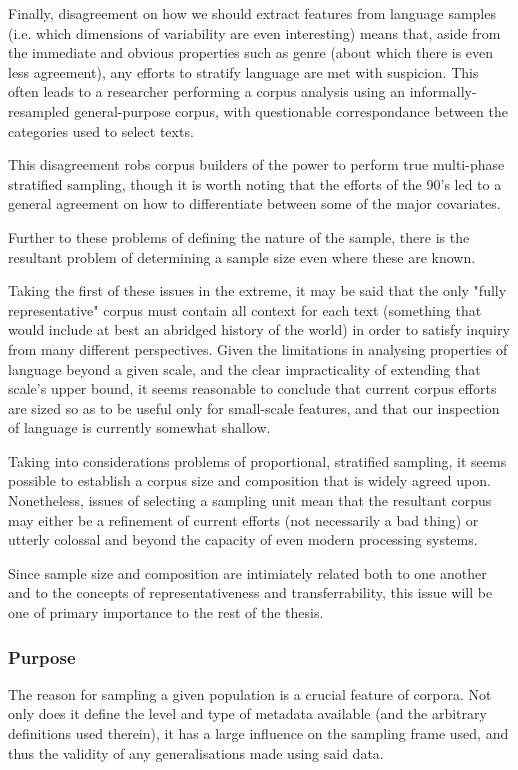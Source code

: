 
Finally, disagreement on how we should extract features from language samples (i.e. which dimensions of variability are even interesting) means that, aside from the immediate and obvious properties such as genre (about which there is even less agreement), any efforts to stratify language are met with suspicion.  This often leads to a researcher performing a corpus analysis using an informally-resampled general-purpose corpus, with questionable correspondance between the categories used to select texts.

This disagreement robs corpus builders of the power to perform true multi-phase stratified sampling, though it is worth noting that the efforts of the 90's led to a general agreement on how to differentiate between some of the major covariates.


Further to these problems of defining the nature of the sample, there is the resultant problem of determining a sample size even where these are known.  

Taking the first of these issues in the extreme, it may be said that the only "fully representative" corpus must contain all context for each text (something that would include at best an abridged history of the world) in order to satisfy inquiry from many different perspectives.  Given the limitations in analysing properties of language beyond a given scale, and the clear impracticality of extending that scale's upper bound, it seems reasonable to conclude that current corpus efforts are sized so as to be useful only for small-scale features, and that our inspection of language is currently somewhat shallow.

Taking into considerations problems of proportional, stratified sampling, it seems possible to establish a corpus size and composition that is widely agreed upon.  Nonetheless, issues of selecting a sampling unit mean that the resultant corpus may either be a refinement of current efforts (not necessarily a bad thing) or utterly colossal and beyond the capacity of even modern processing systems.

Since sample size and composition are intimiately related both to one another and to the concepts of representativeness and transferrability, this issue will be one of primary importance to the rest of the thesis.






\subsubsection{Purpose}
The reason for sampling a given population is a crucial feature of corpora.  Not only does it define the level and type of metadata available (and the arbitrary definitions used therein), it has a large influence on the sampling frame used, and thus the validity of any generalisations made using said data.

